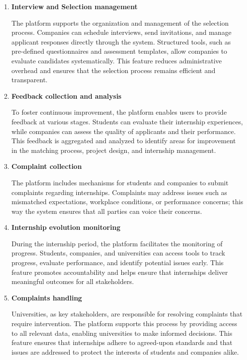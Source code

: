 \begin{enumerate}
\item \textbf{Interview and Selection management}

The platform supports the organization and management of the selection process. Companies can schedule interviews, send invitations, and manage applicant responses directly through the system. Structured tools, such as pre-defined questionnaires and assessment templates, allow companies to evaluate candidates systematically. This feature reduces administrative overhead and ensures that the selection process remains efficient and transparent.

\item \textbf{Feedback collection and analysis}

To foster continuous improvement, the platform enables users to provide feedback at various stages. Students can evaluate their internship experiences, while companies can assess the quality of applicants and their performance. This feedback is aggregated and analyzed to identify areas for improvement in the matching process, project design, and internship management.

\item \textbf{Complaint collection}

The platform includes mechanisms for students and companies to submit complaints regarding internships. Complaints may address issues such as mismatched expectations, workplace conditions, or performance concerns; this way the system ensures that all parties can voice their concerns.

\item \textbf{Internship evolution monitoring}

During the internship period, the platform facilitates the monitoring of progress. Students, companies, and universities can access tools to track progress, evaluate performance, and identify potential issues early. This feature promotes accountability and helps ensure that internships deliver meaningful outcomes for all stakeholders.

\pagebreak
\item \textbf{Complaints handling}

Universities, as key stakeholders, are responsible for resolving complaints that require intervention. The platform supports this process by providing access to all relevant data, enabling universities to make informed decisions. This feature ensures that internships adhere to agreed-upon standards and that issues are addressed to protect the interests of students and companies alike.
\end{enumerate}


